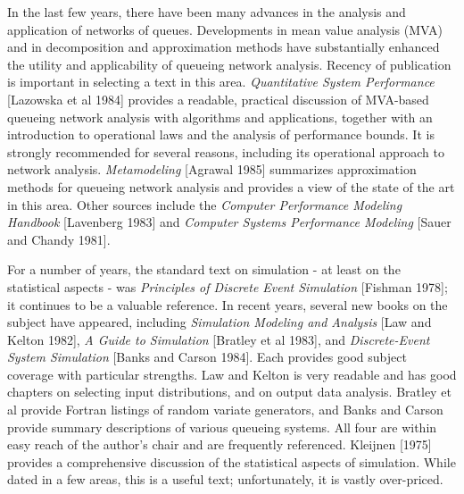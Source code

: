 In the last few years, there have been many advances in the analysis and
application of networks of queues. Developments in mean value analysis (MVA)
and in decomposition and approximation methods have substantially enhanced the
utility and applicability of queueing network analysis. Recency of publication
is important in selecting a text in this area. \textit{Quantitative System Performance}
[Lazowska et al 1984] provides a readable, practical discussion of MVA-based
queueing network analysis with algorithms and applications, together with an
introduction to operational laws and the analysis of performance bounds. It is
strongly recommended for several reasons, including its operational approach
to network analysis. \textit{Metamodeling} [Agrawal 1985] summarizes approximation
methods for queueing network analysis and provides a view of the state of the
art in this area. Other sources include the \textit{Computer Performance Modeling
Handbook} [Lavenberg 1983] and \textit{Computer Systems Performance Modeling} [Sauer and
Chandy 1981].

For a number of years, the standard text on simulation - at least on the
statistical aspects - was \textit{Principles of Discrete Event Simulation} [Fishman
1978]; it continues to be a valuable reference. In recent years, several new
books on the subject have appeared, including \textit{Simulation Modeling and Analysis}
[Law and Kelton 1982], \textit{A Guide to Simulation} [Bratley et al 1983], and
\textit{Discrete-Event System Simulation} [Banks and Carson 1984]. Each provides good
subject coverage with particular strengths. Law and Kelton is very readable
and has good chapters on selecting input distributions, and on output data
analysis. Bratley et al provide Fortran listings of random variate generators,
and Banks and Carson provide summary descriptions of various queueing systems.
All four are within easy reach of the author's chair and are frequently
referenced. Kleijnen [1975] provides a comprehensive discussion of the
statistical aspects of simulation. While dated in a few areas, this is a useful
text; unfortunately, it is vastly over-priced.

